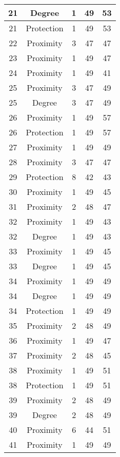 \documentclass[results.tex]{subfiles}
\begin{document}
\begin{center}
\begin{tabular}{| c || c | c | c | c |}
    \hline
    21 & Degree & 1 & 49 & 53 \\ 
    \hline
    21 & Protection & 1 & 49 & 53 \\ 
    \hline
    22 & Proximity & 3 & 47 & 47 \\ 
    \hline
    23 & Proximity & 1 & 49 & 47 \\ 
    \hline
    24 & Proximity & 1 & 49 & 41 \\ 
    \hline
    25 & Proximity & 3 & 47 & 49 \\ 
    \hline
    25 & Degree & 3 & 47 & 49 \\ 
    \hline
    26 & Proximity & 1 & 49 & 57 \\ 
    \hline
    26 & Protection & 1 & 49 & 57 \\ 
    \hline
    27 & Proximity & 1 & 49 & 49 \\ 
    \hline
    28 & Proximity & 3 & 47 & 47 \\ 
    \hline
    29 & Protection & 8 & 42 & 43 \\ 
    \hline
    30 & Proximity & 1 & 49 & 45 \\ 
    \hline
    31 & Proximity & 2 & 48 & 47 \\ 
    \hline
    32 & Proximity & 1 & 49 & 43 \\ 
    \hline
    32 & Degree & 1 & 49 & 43 \\ 
    \hline
    33 & Proximity & 1 & 49 & 45 \\ 
    \hline
    33 & Degree & 1 & 49 & 45 \\ 
    \hline
    34 & Proximity & 1 & 49 & 49 \\ 
    \hline
    34 & Degree & 1 & 49 & 49 \\ 
    \hline
    34 & Protection & 1 & 49 & 49 \\ 
    \hline
    35 & Proximity & 2 & 48 & 49 \\ 
    \hline
    36 & Proximity & 1 & 49 & 47 \\ 
    \hline
    37 & Proximity & 2 & 48 & 45 \\ 
    \hline
    38 & Proximity & 1 & 49 & 51 \\ 
    \hline
    38 & Protection & 1 & 49 & 51 \\ 
    \hline
    39 & Proximity & 2 & 48 & 49 \\ 
    \hline
    39 & Degree & 2 & 48 & 49 \\ 
    \hline
    40 & Proximity & 6 & 44 & 51 \\ 
    \hline
    41 & Proximity & 1 & 49 & 49 \\ 

\end{tabular}
\end{center}
\end{document}
